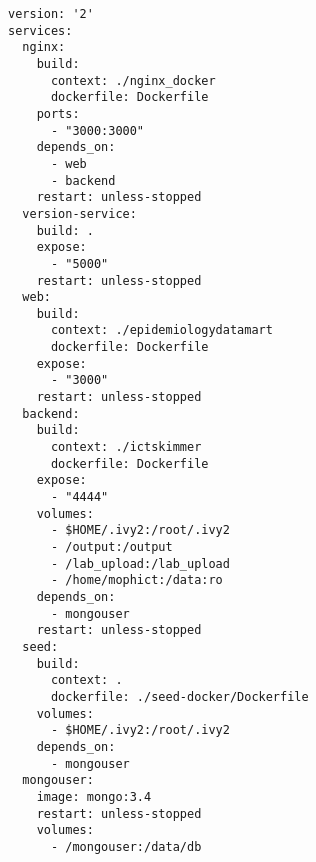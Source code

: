 \begin{verbatim}
version: '2'
services:
  nginx:
    build:
      context: ./nginx_docker
      dockerfile: Dockerfile
    ports:
      - "3000:3000"
    depends_on:
      - web
      - backend
    restart: unless-stopped
  version-service:
    build: .
    expose:
      - "5000"
    restart: unless-stopped
  web:
    build:
      context: ./epidemiologydatamart
      dockerfile: Dockerfile
    expose:
      - "3000"
    restart: unless-stopped
  backend:
    build:
      context: ./ictskimmer
      dockerfile: Dockerfile
    expose:
      - "4444"
    volumes:
      - $HOME/.ivy2:/root/.ivy2
      - /output:/output
      - /lab_upload:/lab_upload
      - /home/mophict:/data:ro
    depends_on:
      - mongouser
    restart: unless-stopped
  seed:
    build:
      context: .
      dockerfile: ./seed-docker/Dockerfile
    volumes:
      - $HOME/.ivy2:/root/.ivy2
    depends_on:
      - mongouser
  mongouser:
    image: mongo:3.4
    restart: unless-stopped
    volumes:
      - /mongouser:/data/db

\end{verbatim}